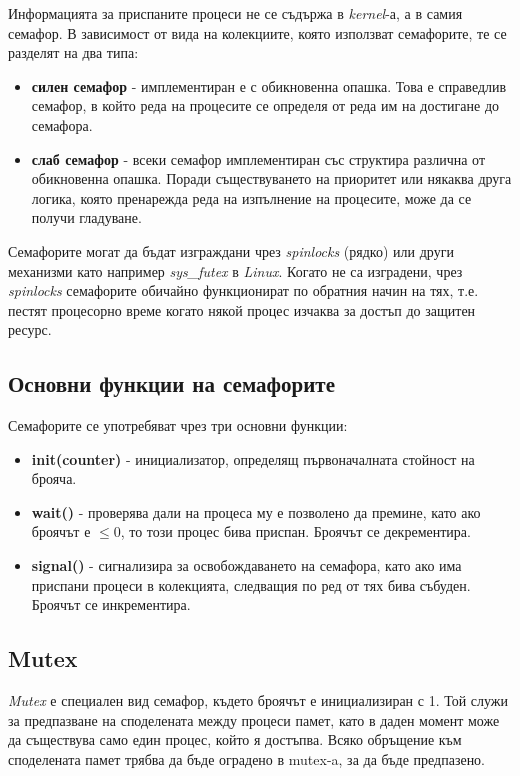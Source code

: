 \documentclass[fleqn,12pt]{article}
\begin{document}
Информацията за приспаните процеси не се съдържа в \textit{kernel}-а, а в самия семафор.
\bigbreak
В зависимост от вида на колекциите, която използват семафорите, те се разделят на два типа:

\begin{itemize}
    \item \textbf{силен семафор} - имплементиран е с обикновенна опашка. Това е справедлив семафор, в който реда на процесите се определя от реда им на достигане до семафора.
    \item \textbf{слаб семафор} - всеки семафор имплементиран със структира различна от обикновенна опашка. Поради съществуването на приоритет или някаква друга логика, която пренарежда реда на изпълнение на процесите, може да се получи гладуване.
\end{itemize}
    
Семафорите могат да бъдат изграждани чрез \textit{spinlocks} (рядко) или други механизми като например \textit{sys\_futex} в \textit{Linux}.
Когато не са изградени, чрез \textit{spinlocks} семафорите обичайно функционират по обратния начин на тях, т.е. пестят процесорно време когато някой процес изчаква за достъп до защитен ресурс.

\subsection{Основни функции на семафорите}

Семафорите се употребяват чрез три основни функции:

\begin{itemize}
    \item \textbf{init(counter)} - инициализатор, определящ първоначалната стойност на брояча.
    \item \textbf{wait()} - проверява дали на процеса му е позволено да премине, като ако броячът е $\leq 0$, то този процес бива приспан. Броячът се декрементира.
    \item \textbf{signal()} - сигнализира за освобождаването на семафора, като ако има приспани процеси в колекцията, следващия по ред от тях бива събуден. Броячът се инкрементира.
\end{itemize}

\subsection{Mutex}

\textit{Mutex} е специален вид семафор, където броячът е инициализиран с 1.
Той служи за предпазване на споделената между процеси памет, като в даден момент може да съществува само един процес, който я достъпва.
Всяко обръщение към споделената памет трябва да бъде оградено в mutex-a, за да бъде предпазено.
\end{document}
